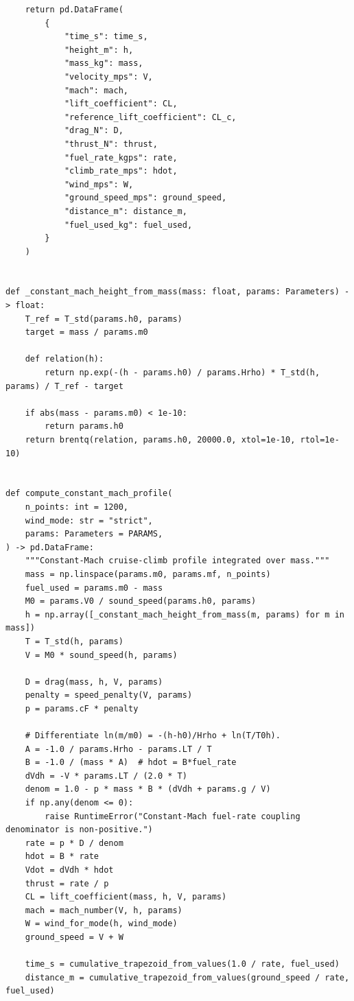 \documentclass[withoutpreface,bwprint]{cumcmthesis} %
\begin{document}
\begin{center}
\begin{lstlisting}
    return pd.DataFrame(
        {
            "time_s": time_s,
            "height_m": h,
            "mass_kg": mass,
            "velocity_mps": V,
            "mach": mach,
            "lift_coefficient": CL,
            "reference_lift_coefficient": CL_c,
            "drag_N": D,
            "thrust_N": thrust,
            "fuel_rate_kgps": rate,
            "climb_rate_mps": hdot,
            "wind_mps": W,
            "ground_speed_mps": ground_speed,
            "distance_m": distance_m,
            "fuel_used_kg": fuel_used,
        }
    )


def _constant_mach_height_from_mass(mass: float, params: Parameters) -> float:
    T_ref = T_std(params.h0, params)
    target = mass / params.m0

    def relation(h):
        return np.exp(-(h - params.h0) / params.Hrho) * T_std(h, params) / T_ref - target

    if abs(mass - params.m0) < 1e-10:
        return params.h0
    return brentq(relation, params.h0, 20000.0, xtol=1e-10, rtol=1e-10)


def compute_constant_mach_profile(
    n_points: int = 1200,
    wind_mode: str = "strict",
    params: Parameters = PARAMS,
) -> pd.DataFrame:
    """Constant-Mach cruise-climb profile integrated over mass."""
    mass = np.linspace(params.m0, params.mf, n_points)
    fuel_used = params.m0 - mass
    M0 = params.V0 / sound_speed(params.h0, params)
    h = np.array([_constant_mach_height_from_mass(m, params) for m in mass])
    T = T_std(h, params)
    V = M0 * sound_speed(h, params)

    D = drag(mass, h, V, params)
    penalty = speed_penalty(V, params)
    p = params.cF * penalty

    # Differentiate ln(m/m0) = -(h-h0)/Hrho + ln(T/T0h).
    A = -1.0 / params.Hrho - params.LT / T
    B = -1.0 / (mass * A)  # hdot = B*fuel_rate
    dVdh = -V * params.LT / (2.0 * T)
    denom = 1.0 - p * mass * B * (dVdh + params.g / V)
    if np.any(denom <= 0):
        raise RuntimeError("Constant-Mach fuel-rate coupling denominator is non-positive.")
    rate = p * D / denom
    hdot = B * rate
    Vdot = dVdh * hdot
    thrust = rate / p
    CL = lift_coefficient(mass, h, V, params)
    mach = mach_number(V, h, params)
    W = wind_for_mode(h, wind_mode)
    ground_speed = V + W

    time_s = cumulative_trapezoid_from_values(1.0 / rate, fuel_used)
    distance_m = cumulative_trapezoid_from_values(ground_speed / rate, fuel_used)


\end{lstlisting}
\end{center}
\end{document}
